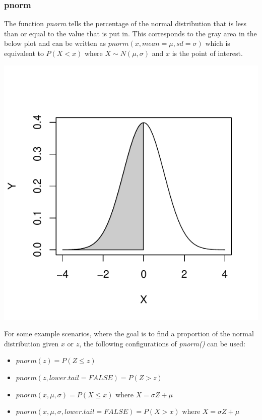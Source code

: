 \documentclass{report}\usepackage[]{graphicx}\usepackage[]{color}
\makeatletter
\def\maxwidth{ %
  \ifdim\Gin@nat@width>\linewidth
    \linewidth
  \else
    \Gin@nat@width
  \fi
}
\newenvironment{knitrout}{}{} %
\makeatother
\begin{document}
\subsubsection{pnorm} 
The function \textit{pnorm} tells the percentage of the normal distribution that is less than or equal to the value that is put in.  This corresponds to the gray area in the below plot and can be written as $pnorm(x, mean = \mu, sd = \sigma)$ which is equivalent to $P(X < x)$ where $X \sim N(\mu, \sigma)$ and $x$ is the point of interest.    
 
\begin{knitrout}
\color{fgcolor}

{\centering \includegraphics[width=\maxwidth]{figure/unnamed-chunk-50-1} 

}



\end{knitrout}

For some example scenarios, where the goal is to find a proportion of the normal distribution given $x$ or $z$, the following configurations of \textit{pnorm()} can be used: 
\begin{itemize}
\item $pnorm(z) = P(Z \leq z)$ 
\item $pnorm(z, lower.tail = FALSE) = P(Z > z)$ 
\item $pnorm(x, \mu, \sigma) = P(X \leq x)$ where $X = \sigma Z + \mu$ 
\item $pnorm(x, \mu, \sigma, lower.tail = FALSE) = P(X > x)$ where $X = \sigma Z + \mu$ 
\end{itemize}
\end{document}
